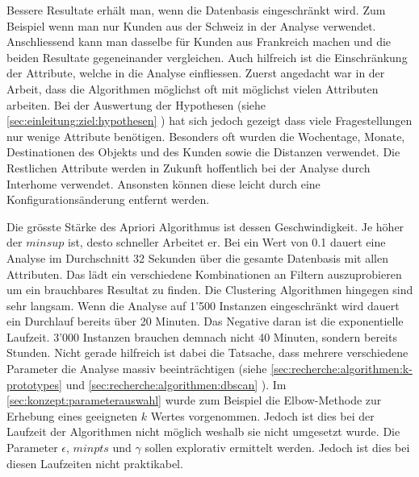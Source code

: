 Bessere Resultate erhält man, wenn die Datenbasis eingeschränkt wird. Zum Beispiel wenn man nur Kunden aus der Schweiz in der Analyse verwendet. Anschliessend kann man dasselbe für Kunden aus Frankreich machen und die beiden Resultate gegeneinander vergleichen. Auch hilfreich ist die Einschränkung der Attribute, welche in die Analyse einfliessen. Zuerst angedacht war in der Arbeit, dass die Algorithmen möglichst oft mit möglichst vielen Attributen arbeiten. Bei der Auswertung der Hypothesen (siehe \cref{sec:einleitung:ziel:hypothesen} ) hat sich jedoch gezeigt dass viele Fragestellungen nur wenige Attribute benötigen. Besonders oft wurden die Wochentage, Monate, Destinationen des Objekts und des Kunden sowie die Distanzen verwendet. Die Restlichen Attribute werden in Zukunft hoffentlich bei der Analyse durch Interhome verwendet. Ansonsten können diese leicht durch eine Konfigurationsänderung entfernt werden.

Die grösste Stärke des Apriori Algorithmus ist dessen Geschwindigkeit. Je höher der $minsup$ ist, desto schneller Arbeitet er. Bei ein Wert von 0.1 dauert eine Analyse im Durchschnitt 32 Sekunden über die gesamte Datenbasis mit allen Attributen. Das lädt ein verschiedene Kombinationen an Filtern auszuprobieren um ein brauchbares Resultat zu finden. Die Clustering Algorithmen hingegen sind sehr langsam. Wenn die Analyse auf 1'500 Instanzen eingeschränkt wird dauert ein Durchlauf bereits über 20 Minuten. Das Negative daran ist die exponentielle Laufzeit. 3'000 Instanzen brauchen demnach nicht 40 Minuten, sondern bereits Stunden. Nicht gerade hilfreich ist dabei die Tatsache, dass mehrere verschiedene Parameter die Analyse massiv beeinträchtigen (siehe \cref{sec:recherche:algorithmen:k-prototypes}  und \cref{sec:recherche:algorithmen:dbscan} ). Im \cref{sec:konzept:parameterauswahl}  wurde zum Beispiel die Elbow-Methode zur Erhebung eines geeigneten $k$ Wertes vorgenommen. Jedoch ist dies bei der Laufzeit der Algorithmen nicht möglich weshalb sie nicht umgesetzt wurde. Die Parameter $\epsilon$, $minpts$ und $\gamma$ sollen explorativ ermittelt werden. Jedoch ist dies bei diesen Laufzeiten nicht praktikabel. 

